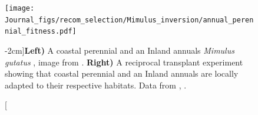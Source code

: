 \begin{figure} %
\begin{center}
\texttt{[image: Journal\_figs/recom\_selection/Mimulus\_inversion/annual\_perennial\_fitness.pdf]}
\end{center}
\caption[][-2cm]{{\bf Left)} A coastal perennial and an Inland annuals {\it Mimulus gutatus} \citet{lowry2010widespread}, image from \citet{lowry2010widespread} \PLOSccBY. {\bf Right)} A reciprocal transplant experiment showing that coastal perennial and an Inland annuals are locally adapted to their respective habitats. Data from  \citet{lowry2010widespread}, . 
}\label{fig:annual_perennial_fitness}
\end{figure}


